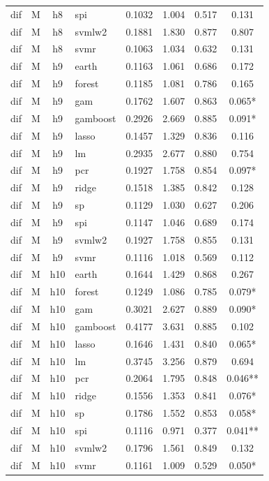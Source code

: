 \begin{ThreePartTable}
\begin{longtable}[t]{llclcccc}
dif & M & h8 & spi & 0.1032 & 1.004 & 0.517 & 0.131\\
dif & M & h8 & svmlw2 & 0.1881 & 1.830 & 0.877 & 0.807\\
dif & M & h8 & svmr & 0.1063 & 1.034 & 0.632 & 0.131\\
\addlinespace
dif & M & h9 & earth & 0.1163 & 1.061 & 0.686 & 0.172\\
dif & M & h9 & forest & 0.1185 & 1.081 & 0.786 & 0.165\\
dif & M & h9 & gam & 0.1762 & 1.607 & 0.863 & 0.065*\\
dif & M & h9 & gamboost & 0.2926 & 2.669 & 0.885 & 0.091*\\
dif & M & h9 & lasso & 0.1457 & 1.329 & 0.836 & 0.116\\
dif & M & h9 & lm & 0.2935 & 2.677 & 0.880 & 0.754\\
dif & M & h9 & pcr & 0.1927 & 1.758 & 0.854 & 0.097*\\
dif & M & h9 & ridge & 0.1518 & 1.385 & 0.842 & 0.128\\
dif & M & h9 & sp & 0.1129 & 1.030 & 0.627 & 0.206\\
dif & M & h9 & spi & 0.1147 & 1.046 & 0.689 & 0.174\\
dif & M & h9 & svmlw2 & 0.1927 & 1.758 & 0.855 & 0.131\\
dif & M & h9 & svmr & 0.1116 & 1.018 & 0.569 & 0.112\\
\addlinespace
dif & M & h10 & earth & 0.1644 & 1.429 & 0.868 & 0.267\\
dif & M & h10 & forest & 0.1249 & 1.086 & 0.785 & 0.079*\\
dif & M & h10 & gam & 0.3021 & 2.627 & 0.889 & 0.090*\\
dif & M & h10 & gamboost & 0.4177 & 3.631 & 0.885 & 0.102\\
dif & M & h10 & lasso & 0.1646 & 1.431 & 0.840 & 0.065*\\
dif & M & h10 & lm & 0.3745 & 3.256 & 0.879 & 0.694\\
dif & M & h10 & pcr & 0.2064 & 1.795 & 0.848 & 0.046**\\
dif & M & h10 & ridge & 0.1556 & 1.353 & 0.841 & 0.076*\\
dif & M & h10 & sp & 0.1786 & 1.552 & 0.853 & 0.058*\\
dif & M & h10 & spi & 0.1116 & 0.971 & 0.377 & 0.041**\\
dif & M & h10 & svmlw2 & 0.1796 & 1.561 & 0.849 & 0.132\\
dif & M & h10 & svmr & 0.1161 & 1.009 & 0.529 & 0.050*\\

\end{longtable}
\end{ThreePartTable}
